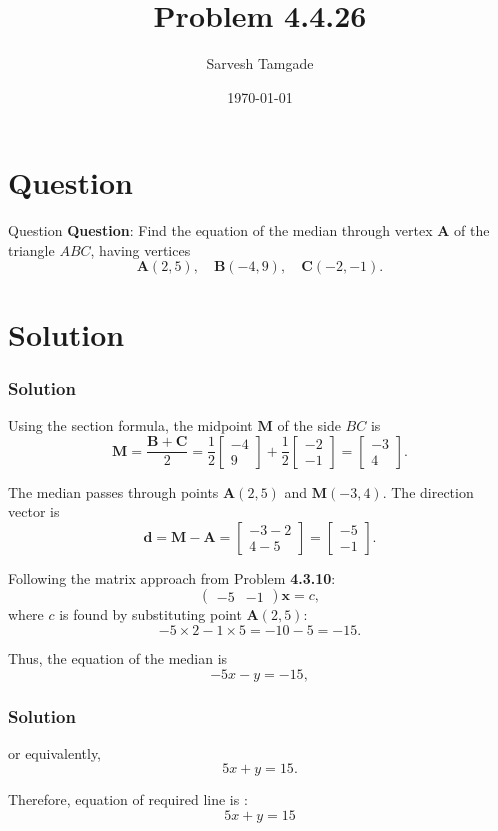 \documentclass{beamer}
\title{Problem 4.4.26}
\author{Sarvesh Tamgade}
\date{\today}
\theoremstyle{remark}
\numberwithin{equation}{section}
\begin{document}
\begin{frame}
\titlepage
\end{frame}

\section{Question}
\begin{frame}{Question}
\textbf{Question}:
 Find the equation of the median through vertex \(\mathbf{A}\) of the triangle \(ABC\), having vertices
\[
\mathbf{A}(2,5), \quad \mathbf{B}(-4,9), \quad \mathbf{C}(-2,-1).
\]

\end{frame}

\section{Solution}
\begin{frame}[fragile]
    \frametitle{Solution}
Using the section formula, the midpoint \(\mathbf{M}\) of the side \(BC\) is 
\[
\mathbf{M} = \frac{\mathbf{B} + \mathbf{C}}{2} = 
\frac{1}{2} \begin{bmatrix} -4 \\ 9 \end{bmatrix} + 
\frac{1}{2} \begin{bmatrix} -2 \\ -1 \end{bmatrix} = 
\begin{bmatrix} -3 \\ 4 \end{bmatrix}.
\]

The median passes through points \(\mathbf{A}(2,5)\) and \(\mathbf{M}(-3,4)\). The direction vector is 
\[
\mathbf{d} = \mathbf{M} - \mathbf{A} = \begin{bmatrix} -3 - 2 \\ 4 - 5 \end{bmatrix} = \begin{bmatrix} -5 \\ -1 \end{bmatrix}.
\]

Following the matrix approach from Problem \textbf{4.3.10}:
\[
\left( \begin{array}{cc} -5 & -1 \end{array} \right) \mathbf{x} = c,
\]
where \(c\) is found by substituting point \(\mathbf{A}(2,5)\):
\[
-5 \times 2 - 1 \times 5 = -10 - 5 = -15.
\]

Thus, the equation of the median is
\[
-5 x - y = -15,
\]



\end{frame}
\begin{frame}[fragile]
    \frametitle{Solution}
or equivalently,
\[
5x + y = 15.
\]

Therefore, equation of required line is  :\[
\boxed{5x + y = 15}
\]



\end{frame}
\end{document}
